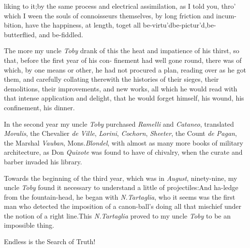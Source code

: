 \documentclass{article}
\begin{document}
\noindent
{}
liking to it;\tsk by the same process and\break
electrical assimilation, as I told you, thro’\break
which I ween the souls of connoisseurs\break
themselves, by long friction and incum-\break
bition, have the happiness, at length, to\pb get all
be-virtu’d\tsk be-pictur’d,\tsk be-butterflied, and
be-fiddled.

The more my uncle \textit{Toby} drank of this\break
{}
the heat and impatience of his thirst,\break
so that, before the first year of his con-\break
finement had well gone round, there was\break
{}
of which, by one means or other, he had not
procured a plan, reading over as he got them, and carefully
collating therewith the histories of their sieges, their
demolitions, their improvements, and new works, all which he
would read with that intense application and delight, that he
would forget himself, his wound, his confinement, his dinner.

In the second year my uncle \textit{Toby} purchased \textit{Ramelli}
and \textit{Cataneo}, translated\pb 
{}
\textit{Moralis}, the Chevalier \textit{de Ville}, \textit{Lorini},\break 
\textit{Cochorn}, \textit{Sheeter}, the Count \textit{de Pagan}, 
the Marshal \textit{Vauban}, Mons.\@ \textit{Blondel}, with\break
almost as many more books of military architecture, as Don
\textit{Quixote} was found to have of chivalry, when the
curate and\break
barber invaded his library.

Towards the beginning of the third year, which was in
\textit{August}, ninety-nine, my uncle \textit{Toby} found it necessary
to understand a little of projectiles:\tsk And ha-\break{}\break ledge from the fountain-head, he began with
\textit{N.\@ Tartaglia}, who it seems was the first man who detected
the imposition of a canon-ball’s doing all that mischief
under the notion of a right line.\tsk This\break
\textit{N.\@ Tartaglia} proved to my uncle \textit{Toby} to be an
impossible thing.

\newpage
\tsh Endless is the Search of Truth!
\end{document}

